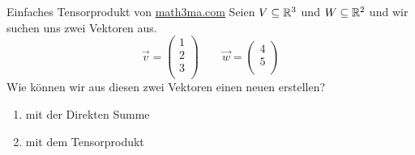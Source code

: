 \begin{Beispiel}{Einfaches Tensorprodukt von \href{https://www.math3ma.com/blog/the-tensor-product-demystified}{math3ma.com}}
    Seien $V\subseteq \mathbb{R}^3$ und $W\subseteq \mathbb{R}^2$ und wir suchen uns zwei Vektoren aus.
    $$\vec{v}=\begin{pmatrix}
        1 \\
        2 \\
        3 \\
    \end{pmatrix} \qquad \vec{w}=\begin{pmatrix}
        4 \\
        5 \\
    \end{pmatrix}$$
    Wie können wir aus diesen zwei Vektoren einen neuen erstellen? \\
    \begin{enumerate}
        \item mit der Direkten Summe
    \item mit dem Tensorprodukt
\end{enumerate}
\end{Beispiel}
